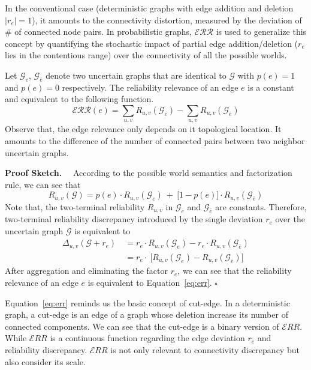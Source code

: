 In the conventional case (deterministic graphs with edge addition and deletion $|r_{e}|=1$), it amounts to the connectivity distortion, measured by the deviation of \# of connected node pairs.  
In probabilistic graphs, $\mathcal{ERR}$ is used to generalize this concept by quantifying the stochastic impact of partial edge addition/deletion ($r_{e}$ lies in the contentious range) over the connectivity of all the possible worlds.
\begin{observation}
  Let $\mathcal{G}_{e}$, $\mathcal{G}_{\bar{e}}$ 
  denote two uncertain graphs that are identical to $\mathcal{G}$ with $p(e)=1$ and $p(e)=0$ respectively. 
  The reliability relevance of an edge $e$ is a constant and equivalent to 
  the following function. 
  \begin{equation}
    \mathcal{ERR}(e) = \sum_{u,v} R_{u,v}(\mathcal{G}_{e}) \big- \sum_{u,v} R_{u,v}(\mathcal{G}_{\bar{e}})
    \label{eq:err}
  \end{equation}
  Observe that, the edge relevance only depends on it topological location. 
  It amounts to the difference of the number of connected pairs between two neighbor uncertain graphs. 
\end{observation}

\textbf{Proof Sketch.}~~
According to the possible world semantics and factorization rule, we can see that   
\begin{equation*}
  R_{u,v} (\mathcal{G}) = p(e) \cdot R_{u,v}(\mathcal{G}_{e}) ~+~ \big[ 1-p(e) \big] \cdot R_{u,v} (\mathcal{G}_{\bar{e}})
\end{equation*}
Note that, the two-terminal reliability $R_{u,v}$ in $\mathcal{G}_{e}$ and $\mathcal{G}_{\bar{e}}$ are constants. 
Therefore, two-terminal reliability discrepancy introduced by the single deviation $r_{e}$ over the uncertain graph $\mathcal{G}$ is equivalent to 
\begin{equation*}
  \begin{split}
    \Delta_{u,v} (\mathcal{G}+r_{e}) ~&= r_{e} \cdot R_{u,v}(\mathcal{G}_{e}) - r_{e} \cdot R_{u,v} (\mathcal{G}_{\bar{e}})\\
    &= r_{e} \cdot ~\big[  R_{u,v}(\mathcal{G}_{e}) - R_{u,v} (\mathcal{G}_{\bar{e}})  \big]
  \end{split}
\end{equation*}
After aggregation and eliminating the factor $r_{e}$, we can see that the reliability relevance of an edge $e$ is equivalent to Equation~\ref{eq:err}. $\square$

Equation~\ref{eq:err} reminds us the basic concept of cut-edge. 
In a deterministic graph, a cut-edge is an edge of a graph whose deletion increase its number of connected components. 
We can see that the cut-edge is a binary version of $\mathcal{E}RR$.  
While $\mathcal{E}RR$ is a continuous function regarding the edge deviation $r_{e}$ and reliability discrepancy. 
$\mathcal{E}RR$ is not only relevant to connectivity discrepancy but also consider its scale.  



